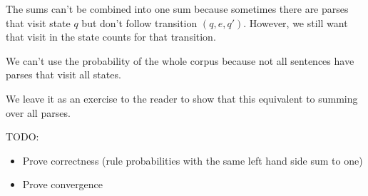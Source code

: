 \documentclass[12pt]{article}
\theoremstyle{definition}
\begin{document}


The sums can't be combined into one sum because sometimes there are parses that visit state $q$ but don't follow transition $(q,e,q')$. However, we still want that visit in the state counts for that transition.

We can't use the probability of the whole corpus because not all sentences have parses that visit all states.



We leave it as an exercise to the reader to show that this equivalent to summing over all parses.


TODO:
\begin{itemize}
\item Prove correctness (rule probabilities with the same left hand side sum to one)
\item Prove convergence
\end{itemize}
\end{document}
